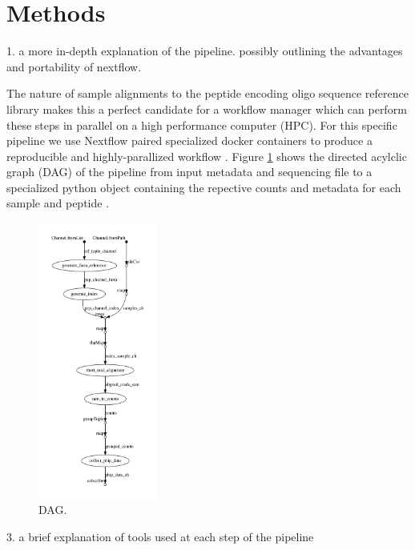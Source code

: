 \documentclass{article}
\begin{document}
\section*{Methods}

1. a more in-depth explanation of the pipeline. possibly outlining the advantages and portability of nextflow.

The nature of sample alignments to the peptide encoding oligo sequence reference library makes this a perfect candidate for a workflow manager which 
can perform these steps in parallel on a high performance computer (HPC). 
For this specific pipeline we use Nextflow paired specialized docker containers to produce a reproducible and highly-parallized workflow \cite{Merkel_2017, DiTommaso2017}.
Figure \ref{fig:DAG} shows the directed acylclic graph (DAG) of the pipeline from input metadata and sequencing file to a specialized python object containing
the repective counts and metadata for each sample and peptide \cite{van1995python}.

\begin{figure}[h!!!!]
\centering
    \includegraphics[width=0.35\textwidth]{figures/dag-1.png}
    \caption{DAG.}
\label{fig:DAG}
\end{figure}

3. a brief explanation of tools used at each step of the pipeline

\end{document}

